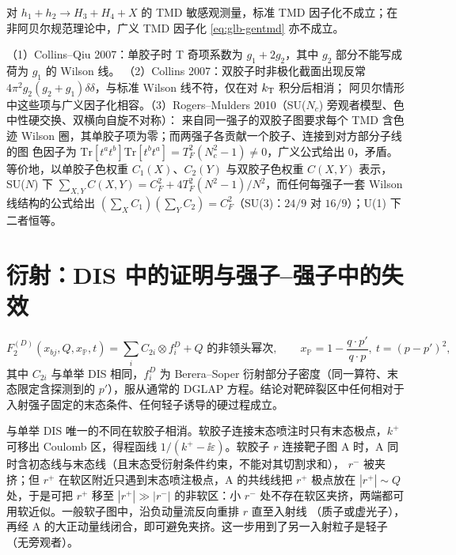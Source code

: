 \begin{theorem}\label{thm:glb-tmdbreak}
对 $h_1+h_2\to H_3+H_4+X$ 的 TMD 敏感观测量，标准 TMD 因子化不成立；在非阿贝尔规范理论中，广义 TMD 因子化
\eqref{eq:glb-gentmd} 亦不成立。
\end{theorem}
\begin{proofsketch}
（1）Collins--Qiu 2007：单胶子时 T 奇项系数为 $g_1+2g_2$，其中 $g_2$ 部分不能写成荷为 $g_1$ 的 Wilson 线。
（2）Collins 2007：双胶子时非极化截面出现反常 $4\pi^2g_2(g_2+g_1)\delta\delta$，与标准 Wilson 线不符，仅在对 $k_{\mathrm{T}}$ 积分后相消；
阿贝尔情形中这些项与广义因子化相容。（3）Rogers--Mulders 2010（SU($N_c$) 旁观者模型、色中性硬交换、双横向自旋不对称）：
来自同一强子的双胶子图要求每个 TMD 含色迹 Wilson 圈，其单胶子项为零；而两强子各贡献一个胶子、连接到对方部分子线的图
色因子为 $\mathrm{Tr}[t^at^b]\mathrm{Tr}[t^bt^a]=T_F^2(N_c^2-1)\neq0$，广义公式给出 $0$，矛盾。等价地，以单胶子色权重
$C_1(X)$、$C_2(Y)$ 与双胶子色权重 $C(X,Y)$ 表示，SU($N$) 下 $\sum_{X,Y}C(X,Y)=C_F^2+4T_F^2(N^2-1)/N^2$，而任何每强子一套 Wilson
线结构的公式给出 $(\sum_XC_1)(\sum_YC_2)=C_F^2$（SU(3)：$24/9$ 对 $16/9$）；U(1) 下二者恒等。
\end{proofsketch}

\section{衍射：DIS 中的证明与强子–强子中的失效}\label{sec:glb-diff}

\begin{theorem}\label{thm:glb-ddis}
\begin{equation}\label{eq:glb-ddis}
F_2^{(D)}(x_{bj},Q,x_{\mathbb P},t)=\sum_iC_{2i}\otimes f_i^{D}+\text{$Q$ 的非领头幂次},\qquad
x_{\mathbb P}=1-\frac{q\cdot p'}{q\cdot p},\ t=(p-p')^2,
\end{equation}
其中 $C_{2i}$ 与单举 DIS 相同，$f_i^D$ 为 Berera--Soper 衍射部分子密度（同一算符、末态限定含探测到的 $p'$），服从通常的 DGLAP
方程。结论对靶碎裂区中任何相对于入射强子固定的末态条件、任何轻子诱导的硬过程成立。
\end{theorem}
\begin{proofsketch}
与单举 DIS 唯一的不同在软胶子相消。软胶子连接末态喷注时只有末态极点，$k^+$ 可移出 Coulomb 区，得程函线
$1/(k^+-\ii\varepsilon)$。软胶子 $r$ 连接靶子图 A 时，A 同时含初态线与末态线（且末态受衍射条件约束，不能对其切割求和），
$r^-$ 被夹挤；但 $r^+$ 在软区附近只遇到末态喷注极点，A 的共线线把 $r^+$ 极点放在 $|r^+|\sim Q$ 处，于是可把 $r^+$ 移至
$|r^+|\gg|r^-|$ 的非软区：小 $r^-$ 处不存在软区夹挤，两端都可用软近似。一般软子图中，沿负动量流反向重排 $r$ 直至入射线
（质子或虚光子），再经 A 的大正动量线闭合，即可避免夹挤。这一步用到了另一入射粒子是轻子（无旁观者）。
\end{proofsketch}

